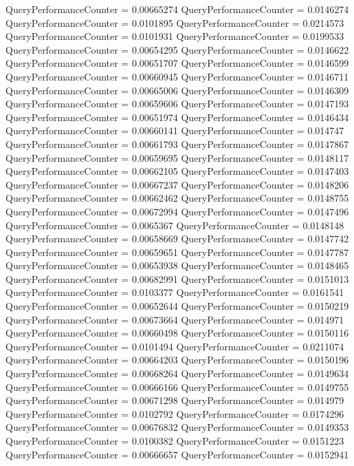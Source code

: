 \documentclass[9pt]{article}
\theoremstyle{plain}
\theoremstyle{definition}
\theoremstyle{remark}
\numberwithin{equation}{section}
\begin{document}
QueryPerformanceCounter  =  0.00665274
QueryPerformanceCounter  =  0.0146274
QueryPerformanceCounter  =  0.0101895
QueryPerformanceCounter  =  0.0214573
QueryPerformanceCounter  =  0.0101931
QueryPerformanceCounter  =  0.0199533
QueryPerformanceCounter  =  0.00654295
QueryPerformanceCounter  =  0.0146622
QueryPerformanceCounter  =  0.00651707
QueryPerformanceCounter  =  0.0146599
QueryPerformanceCounter  =  0.00660945
QueryPerformanceCounter  =  0.0146711
QueryPerformanceCounter  =  0.00665006
QueryPerformanceCounter  =  0.0146309
QueryPerformanceCounter  =  0.00659606
QueryPerformanceCounter  =  0.0147193
QueryPerformanceCounter  =  0.00651974
QueryPerformanceCounter  =  0.0146434
QueryPerformanceCounter  =  0.00660141
QueryPerformanceCounter  =  0.014747
QueryPerformanceCounter  =  0.00661793
QueryPerformanceCounter  =  0.0147867
QueryPerformanceCounter  =  0.00659695
QueryPerformanceCounter  =  0.0148117
QueryPerformanceCounter  =  0.00662105
QueryPerformanceCounter  =  0.0147403
QueryPerformanceCounter  =  0.00667237
QueryPerformanceCounter  =  0.0148206
QueryPerformanceCounter  =  0.00662462
QueryPerformanceCounter  =  0.0148755
QueryPerformanceCounter  =  0.00672994
QueryPerformanceCounter  =  0.0147496
QueryPerformanceCounter  =  0.0065367
QueryPerformanceCounter  =  0.0148148
QueryPerformanceCounter  =  0.00658669
QueryPerformanceCounter  =  0.0147742
QueryPerformanceCounter  =  0.00659651
QueryPerformanceCounter  =  0.0147787
QueryPerformanceCounter  =  0.00653938
QueryPerformanceCounter  =  0.0148465
QueryPerformanceCounter  =  0.00682991
QueryPerformanceCounter  =  0.0151013
QueryPerformanceCounter  =  0.0103377
QueryPerformanceCounter  =  0.0161541
QueryPerformanceCounter  =  0.00652644
QueryPerformanceCounter  =  0.0150219
QueryPerformanceCounter  =  0.00673664
QueryPerformanceCounter  =  0.014971
QueryPerformanceCounter  =  0.00660498
QueryPerformanceCounter  =  0.0150116
QueryPerformanceCounter  =  0.0101494
QueryPerformanceCounter  =  0.0211074
QueryPerformanceCounter  =  0.00664203
QueryPerformanceCounter  =  0.0150196
QueryPerformanceCounter  =  0.00668264
QueryPerformanceCounter  =  0.0149634
QueryPerformanceCounter  =  0.00666166
QueryPerformanceCounter  =  0.0149755
QueryPerformanceCounter  =  0.00671298
QueryPerformanceCounter  =  0.014979
QueryPerformanceCounter  =  0.0102792
QueryPerformanceCounter  =  0.0174296
QueryPerformanceCounter  =  0.00676832
QueryPerformanceCounter  =  0.0149353
QueryPerformanceCounter  =  0.0100382
QueryPerformanceCounter  =  0.0151223
QueryPerformanceCounter  =  0.00666657
QueryPerformanceCounter  =  0.0152941
\end{document}
